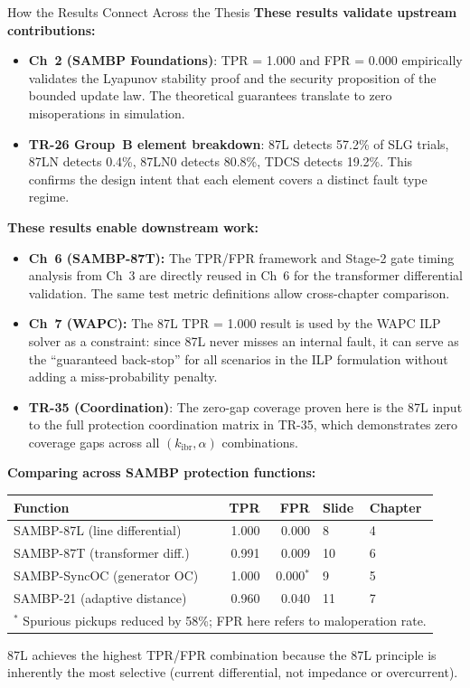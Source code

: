 \documentclass[12pt,a4paper]{article}
\newcommand{\kibr}{k_\mathrm{ibr}}
\begin{document}
\begin{archbox}{How the Results Connect Across the Thesis}
\textbf{These results validate upstream contributions:}
\begin{itemize}[nosep]
  \item \textbf{Ch~2 (SAMBP Foundations)}: TPR = 1.000 and FPR = 0.000 empirically validates the Lyapunov stability proof and the security proposition of the bounded update law. The theoretical guarantees translate to zero misoperations in simulation.
  \item \textbf{TR-26 Group~B element breakdown}: 87L detects 57.2\% of SLG trials, 87LN detects 0.4\%, 87LN0 detects 80.8\%, TDCS detects 19.2\%. This confirms the design intent that each element covers a distinct fault type regime.
\end{itemize}

\textbf{These results enable downstream work:}
\begin{itemize}[nosep]
  \item \textbf{Ch~6 (SAMBP-87T):} The TPR/FPR framework and Stage-2 gate timing analysis from Ch~3 are directly reused in Ch~6 for the transformer differential validation. The same test metric definitions allow cross-chapter comparison.
  \item \textbf{Ch~7 (WAPC):} The 87L TPR = 1.000 result is used by the WAPC ILP solver as a constraint: since 87L never misses an internal fault, it can serve as the ``guaranteed back-stop'' for all scenarios in the ILP formulation without adding a miss-probability penalty.
  \item \textbf{TR-35 (Coordination)}: The zero-gap coverage proven here is the 87L input to the full protection coordination matrix in TR-35, which demonstrates zero coverage gaps across all $(\kibr, \alpha)$ combinations.
\end{itemize}

\textbf{Comparing across SAMBP protection functions:}
\begin{center}
\begin{tabular}{@{}lrrll@{}}
\toprule
\textbf{Function} & \textbf{TPR} & \textbf{FPR} & \textbf{Slide} & \textbf{Chapter} \\
\midrule
SAMBP-87L (line differential)     & 1.000 & 0.000 & 8 & 4 \\
SAMBP-87T (transformer diff.)     & 0.991 & 0.009 & 10 & 6 \\
SAMBP-SyncOC (generator OC)       & 1.000 & 0.000$^*$ & 9 & 5 \\
SAMBP-21 (adaptive distance)      & 0.960 & 0.040 & 11 & 7 \\
\bottomrule
\multicolumn{5}{l}{$^*$ Spurious pickups reduced by 58\%; FPR here refers to maloperation rate.}
\end{tabular}
\end{center}
87L achieves the highest TPR/FPR combination because the 87L principle is inherently the most selective (current differential, not impedance or overcurrent).
\end{archbox}
\end{document}
